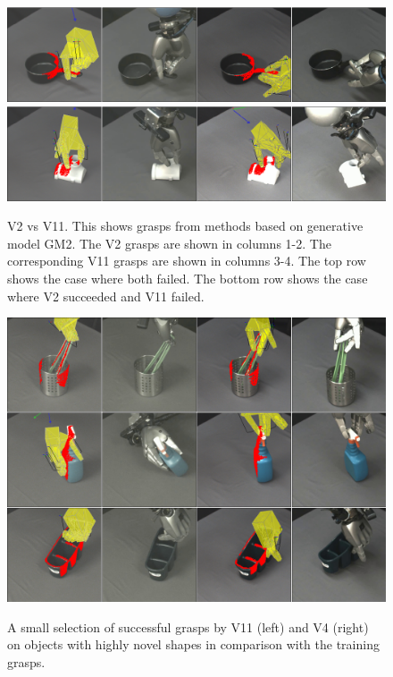 \begin{figure}[t]
\begin{center}
\includegraphics[width=0.5\columnwidth]{plots/A6fA10f_vertical.png}\\
\includegraphics[width=0.5\columnwidth]{plots/A6sA10f_vertical.png}
\caption{V2 vs V11. This shows grasps from methods based on generative model GM2. The V2 grasps are shown in columns 1-2. The corresponding V11 grasps are shown in columns 3-4. The top row shows the case where both failed. The bottom row shows the case where V2 succeeded and V11 failed. \label{fig:v2fsv11f}}
\end{center}
\end{figure}

\begin{figure}[t]
\begin{center}
\includegraphics[width=0.5\columnwidth]{images/A9A10_vertical}\\
\caption{A small selection of successful grasps by V11 (left) and V4 (right) on objects with highly novel shapes in comparison with the training grasps. \label{fig:interest}}
\end{center}
\end{figure}




